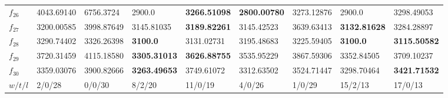 \begin{table*}[t!]
{\begin{tabular}{|p{0.8cm}|p{1.6cm}|p{1.6cm}|p{1.6cm}|p{1.6cm}|p{1.6cm}|p{1.6cm}|p{1.6cm}|p{1.6cm}|}
$f_{26}$  & 4043.69140 & 6756.3724 & 2900.0 & \textbf{3266.51098} & \textbf{2800.00780} & 3273.12876 & 2900.0 & 3298.49053 \\ 
$f_{27}$  & 3200.00585 & 3998.87649 & 3145.81035 & \textbf{3189.82261} & 3145.42523 & 3639.63413 & \textbf{3132.81628} & 3284.28897 \\ 
$f_{28}$  & 3290.74402 & 3326.26398 & \textbf{3100.0} & 3131.02731 & 3195.48683 & 3225.59405 & \textbf{3100.0} & \textbf{3115.50582} \\ 
$f_{29}$  & 3720.31459 & 4115.18580 & \textbf{3305.31013} & \textbf{3626.88755} & 3535.95229 & 3867.59306 & 3352.84505 & 3709.10237 \\ 
$f_{30}$  & 3359.03076 & 3900.82666 & \textbf{3263.49653} & 3749.61072 & 3312.63502 & 3524.71447 & 3298.70464 & \textbf{3421.71532} \\ 
\hline
$w/t/l$  & 2/0/28 & 0/0/30 & 8/2/20 & 11/0/19 & 4/0/26 & 1/0/29 & 15/2/13 & 17/0/13 \\
\hline
\end{tabular}}
\end{table*}
